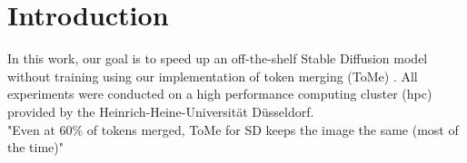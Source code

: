 \section{Introduction}
In this work, our goal is to speed up an off-the-shelf Stable Diffusion model without training using our implementation of token merging (ToMe) \cite{bolya2023tomesd}.
All experiments were conducted on a high performance computing cluster (hpc) provided by the Heinrich-Heine-Universität Düsseldorf.\\
"Even at 60\% of tokens merged, ToMe for SD keeps the image the same (most of the time)"